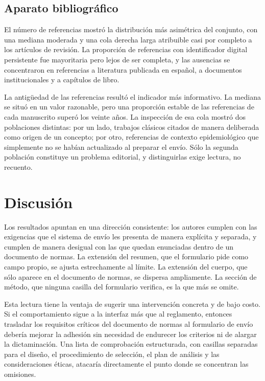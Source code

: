 \documentclass{apm-editorial}
\begin{document}
\subsection*{Aparato bibliográfico}

El número de referencias mostró la distribución más asimétrica del
conjunto, con una mediana moderada y una cola derecha larga atribuible
casi por completo a los artículos de revisión. La proporción de
referencias con identificador digital persistente fue mayoritaria pero
lejos de ser completa, y las ausencias se concentraron en referencias a
literatura publicada en español, a documentos institucionales y a
capítulos de libro.

La antigüedad de las referencias resultó el indicador más informativo.
La mediana se situó en un valor razonable, pero una proporción estable
de las referencias de cada manuscrito superó los veinte años. La
inspección de esa cola mostró dos poblaciones distintas: por un lado,
trabajos clásicos citados de manera deliberada como origen de un
concepto; por otro, referencias de contexto epidemiológico que
simplemente no se habían actualizado al preparar el envío. Sólo la
segunda población constituye un problema editorial, y distinguirlas
exige lectura, no recuento.

\section*{Discusión}

Los resultados apuntan en una dirección consistente: los autores
cumplen con las exigencias que el sistema de envío les presenta de
manera explícita y separada, y cumplen de manera desigual con las que
quedan enunciadas dentro de un documento de normas. La extensión del
resumen, que el formulario pide como campo propio, se ajusta
estrechamente al límite. La extensión del cuerpo, que sólo aparece en
el documento de normas, se dispersa ampliamente. La sección de método,
que ninguna casilla del formulario verifica, es la que más se omite.

Esta lectura tiene la ventaja de sugerir una intervención concreta y de
bajo costo. Si el comportamiento sigue a la interfaz más que al
reglamento, entonces trasladar los requisitos críticos del documento de
normas al formulario de envío debería mejorar la adhesión sin necesidad
de endurecer los criterios ni de alargar la dictaminación. Una lista de
comprobación estructurada, con casillas separadas para el diseño, el
procedimiento de selección, el plan de análisis y las consideraciones
éticas, atacaría directamente el punto donde se concentran las
omisiones.
\end{document}
